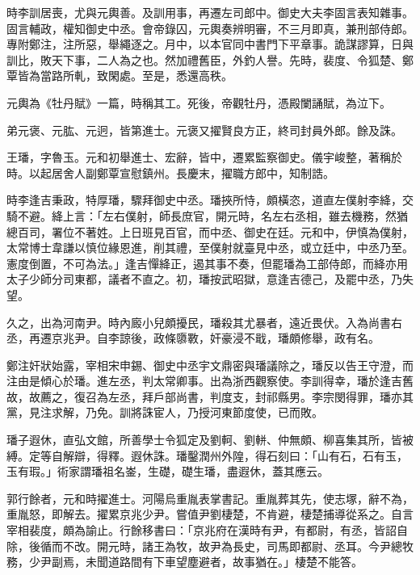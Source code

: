 \begin{pinyinscope}
 時李訓居喪，尤與元輿善。及訓用事，再遷左司郎中。御史大夫李固言表知雜事。固言輔政，權知御史中丞。會帝錄囚，元輿奏辨明審，不三月即真，兼刑部侍郎。專附鄭注，注所惡，舉繩逐之。月中，以本官同中書門下平章事。詭謀謬算，日與訓比，敗天下事，二人為之也。然加禮舊臣，外釣人譽。先時，裴度、令狐楚、鄭覃皆為當路所軋，致閑處。至是，悉還高秩。



 元輿為《牡丹賦》一篇，時稱其工。死後，帝觀牡丹，憑殿闌誦賦，為泣下。



 弟元褒、元肱、元迥，皆第進士。元褒又擢賢良方正，終司封員外郎。餘及誅。



 王璠，字魯玉。元和初舉進士、宏辭，皆中，遷累監察御史。儀宇峻整，著稱於時。以起居舍人副鄭覃宣慰鎮州。長慶末，擢職方郎中，知制誥。



 時李逢吉秉政，特厚璠，驟拜御史中丞。璠挾所恃，頗橫恣，道直左僕射李絳，交騎不避。絳上言：「左右僕射，師長庶官，開元時，名左右丞相，雖去機務，然猶總百司，署位不著姓。上日班見百官，而中丞、御史在廷。元和中，伊慎為僕射，太常博士韋謙以慎位緣恩進，削其禮，至僕射就臺見中丞，或立廷中，中丞乃至。憲度倒置，不可為法。」逢吉憚絳正，遏其事不奏，但罷璠為工部侍郎，而絳亦用太子少師分司東都，議者不直之。初，璠按武昭獄，意逢吉德己，及罷中丞，乃失望。



 久之，出為河南尹。時內廄小兒頗擾民，璠殺其尤暴者，遠近畏伏。入為尚書右丞，再遷京兆尹。自李諒後，政條隳斁，奸豪浸不戢，璠頗修舉，政有名。



 鄭注奸狀始露，宰相宋申錫、御史中丞宇文鼎密與璠議除之，璠反以告王守澄，而注由是傾心於璠。進左丞，判太常卿事。出為浙西觀察使。李訓得幸，璠於逢吉舊故，故薦之，復召為左丞，拜戶部尚書，判度支，封祁縣男。李宗閔得罪，璠亦其黨，見注求解，乃免。訓將誅宦人，乃授河東節度使，已而敗。



 璠子遐休，直弘文館，所善學士令狐定及劉軻、劉軿、仲無頗、柳喜集其所，皆被縛。定等自解辯，得釋。遐休誅。璠鑿潤州外隍，得石刻曰：「山有石，石有玉，玉有瑕。」術家謂璠祖名崟，生礎，礎生璠，盡遐休，蓋其應云。



 郭行餘者，元和時擢進士。河陽烏重胤表掌書記。重胤葬其先，使志塚，辭不為，重胤怒，即解去。擢累京兆少尹。嘗值尹劉棲楚，不肯避，棲楚捕導從系之。自言宰相裴度，頗為諭止。行餘移書曰：「京兆府在漢時有尹，有都尉，有丞，皆詔自除，後循而不改。開元時，諸王為牧，故尹為長史，司馬即都尉、丞耳。今尹總牧務，少尹副焉，未聞道路間有下車望塵避者，故事猶在。」棲楚不能答。




\end{pinyinscope}

